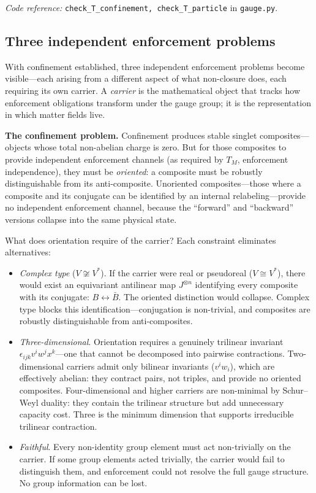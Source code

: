\documentclass[11pt]{article}
\newenvironment{varlist}{\begin{itemize}[nosep,leftmargin=2em]}{\end{itemize}}
\newcommand{\coderef}[2]{\smallskip\noindent\textit{Code reference:} \texttt{#1} in \texttt{#2}.}
\begin{document}
\coderef{check\_T\_confinement, check\_T\_particle}{gauge.py}

\subsection{Three independent enforcement problems}

With confinement established, three independent enforcement problems become visible---each arising from a different aspect of what non-closure does, each requiring its own carrier.  A \emph{carrier} is the mathematical object that tracks how enforcement obligations transform under the gauge group; it is the representation in which matter fields live.

\textbf{The confinement problem.}  Confinement produces stable singlet composites---objects whose total non-abelian charge is zero.  But for those composites to provide independent enforcement channels (as required by $T_M$, enforcement independence), they must be \emph{oriented}: a composite must be robustly distinguishable from its anti-composite.  Unoriented composites---those where a composite and its conjugate can be identified by an internal relabeling---provide no independent enforcement channel, because the ``forward'' and ``backward'' versions collapse into the same physical state.

What does orientation require of the carrier?  Each constraint eliminates alternatives:

\begin{varlist}
\item \textit{Complex type} ($V \not\cong V^*$).  If the carrier were real or pseudoreal ($V \cong V^*$), there would exist an equivariant antilinear map $J^{\otimes n}$ identifying every composite with its conjugate: $B \leftrightarrow \bar{B}$.  The oriented distinction would collapse.  Complex type blocks this identification---conjugation is non-trivial, and composites are robustly distinguishable from anti-composites.
\item \textit{Three-dimensional}.  Orientation requires a genuinely trilinear invariant $\epsilon_{ijk} v^i w^j x^k$---one that cannot be decomposed into pairwise contractions.  Two-dimensional carriers admit only bilinear invariants ($v^i w_i$), which are effectively abelian: they contract pairs, not triples, and provide no oriented composites.  Four-dimensional and higher carriers are non-minimal by Schur--Weyl duality: they contain the trilinear structure but add unnecessary capacity cost.  Three is the minimum dimension that supports irreducible trilinear contraction.
\item \textit{Faithful}.  Every non-identity group element must act non-trivially on the carrier.  If some group elements acted trivially, the carrier would fail to distinguish them, and enforcement could not resolve the full gauge structure.  No group information can be lost.
\end{varlist}
\end{document}
